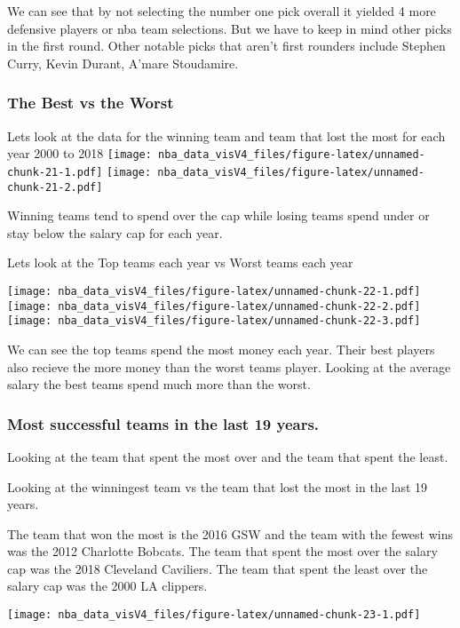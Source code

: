 \documentclass[]{article}
\begin{document}
We can see that by not selecting the number one pick overall it yielded
4 more defensive players or nba team selections. But we have to keep in
mind other picks in the first round. Other notable picks that aren't
first rounders include Stephen Curry, Kevin Durant, A'mare Stoudamire.

\subsubsection{The Best vs the Worst}\label{the-best-vs-the-worst}

Lets look at the data for the winning team and team that lost the most
for each year 2000 to 2018
\texttt{[image: nba\_data\_visV4\_files/figure-latex/unnamed-chunk-21-1.pdf]}
\texttt{[image: nba\_data\_visV4\_files/figure-latex/unnamed-chunk-21-2.pdf]}

Winning teams tend to spend over the cap while losing teams spend under
or stay below the salary cap for each year.

Lets look at the Top teams each year vs Worst teams each year

\texttt{[image: nba\_data\_visV4\_files/figure-latex/unnamed-chunk-22-1.pdf]}
\texttt{[image: nba\_data\_visV4\_files/figure-latex/unnamed-chunk-22-2.pdf]}
\texttt{[image: nba\_data\_visV4\_files/figure-latex/unnamed-chunk-22-3.pdf]}

We can see the top teams spend the most money each year. Their best
players also recieve the more money than the worst teams player. Looking
at the average salary the best teams spend much more than the worst.

\subsubsection{Most successful teams in the last 19
years.}\label{most-successful-teams-in-the-last-19-years.}

Looking at the team that spent the most over and the team that spent the
least.

Looking at the winningest team vs the team that lost the most in the
last 19 years.

The team that won the most is the 2016 GSW and the team with the fewest
wins was the 2012 Charlotte Bobcats. The team that spent the most over
the salary cap was the 2018 Cleveland Caviliers. The team that spent the
least over the salary cap was the 2000 LA clippers.

\texttt{[image: nba\_data\_visV4\_files/figure-latex/unnamed-chunk-23-1.pdf]}
\end{document}
